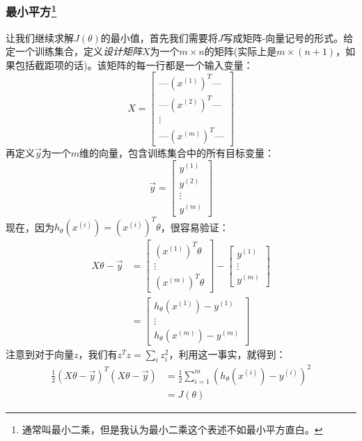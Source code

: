 \subsubsection{最小平方\protect\footnote{通常叫最小二乘，但是我认为最小二乘这个表述不如最小平方直白。}}
让我们继续求解$J(\theta)$的最小值，首先我们需要将$J$写成矩阵-向量记号的形式。给定一个训练集合，定义\emph{设计矩阵}$X$为一个$m \times n$的矩阵(实际上是$m \times (n + 1)$，如果包括截距项的话)。该矩阵的每一行都是一个输入变量：
\begin{equation*}
X =
\begin{bmatrix}
\text{---} (x^{(1)})^T \text{---} \\
\text{---} (x^{(2)})^T \text{---} \\
\vdots \\
\text{---} (x^{(m)})^T \text{---}
\end{bmatrix}
\end{equation*}
再定义$\vec{y}$为一个$m$维的向量，包含训练集合中的所有目标变量：
\begin{equation*}
\vec{y} =
\begin{bmatrix}
y^{(1)} \\
y^{(2)} \\
\vdots \\
y^{(m)}
\end{bmatrix}
\end{equation*}
现在，因为$h_\theta(x^{(i)}) = (x^{(i)})^T\theta$，很容易验证：
\begin{equation*}
\begin{split}
X\theta - \vec{y} &=
\begin{bmatrix}
(x^{(1)})^T\theta \\
\vdots \\
(x^{(m)})^T\theta
\end{bmatrix}
-
\begin{bmatrix}
y^{(1)} \\
\vdots \\
y^{(m)}
\end{bmatrix} \\
&=
\begin{bmatrix}
h_\theta(x^{(1)}) - y^{(1)} \\
\vdots \\
h_\theta(x^{(m)}) - y^{(m)} 
\end{bmatrix}
\end{split}
\end{equation*}
注意到对于向量$z$，我们有$z^Tz = \sum_iz^2_i$，利用这一事实，就得到：
\begin{equation*}
\begin{split}
\frac{1}{2}(X\theta - \vec{y})^T(X\theta - \vec{y}) &= \frac{1}{2}\sum_{i = 1}^m(h_\theta(x^{(i)}) - y^{(i)})^2 \\
&= J(\theta)
\end{split}
\end{equation*}
